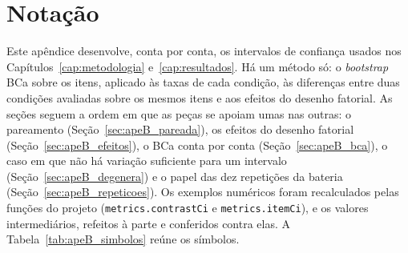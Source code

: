 \section{Notação}\label{sec:apeB_notacao}

Este apêndice desenvolve, conta por conta, os intervalos de confiança usados
nos Capítulos~\ref{cap:metodologia} e~\ref{cap:resultados}. Há um método só:
o \textit{bootstrap} BCa \cite{efron1987better} sobre os itens, aplicado às
taxas de cada condição, às diferenças entre duas condições avaliadas sobre os
mesmos itens e aos efeitos do desenho fatorial. As seções seguem a ordem em
que as peças se apoiam umas nas outras: o pareamento
(Seção~\ref{sec:apeB_pareada}), os efeitos do desenho fatorial
(Seção~\ref{sec:apeB_efeitos}), o BCa conta por conta
(Seção~\ref{sec:apeB_bca}), o caso em que não há variação suficiente para um
intervalo (Seção~\ref{sec:apeB_degenera}) e o papel das dez repetições da
bateria (Seção~\ref{sec:apeB_repeticoes}). Os exemplos numéricos foram
recalculados pelas funções do projeto (\texttt{metrics.contrastCi} e
\texttt{metrics.itemCi}), e os valores intermediários, refeitos à parte e
conferidos contra elas. A Tabela~\ref{tab:apeB_simbolos} reúne os símbolos.

